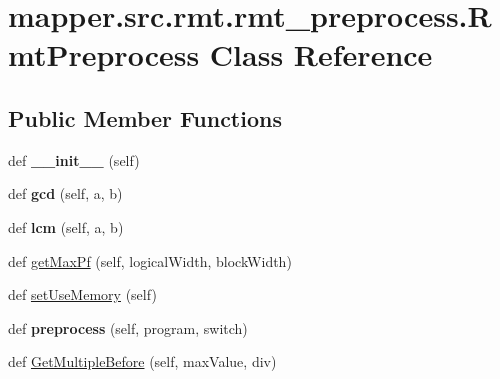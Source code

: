 \hypertarget{classmapper_1_1src_1_1rmt_1_1rmt__preprocess_1_1_rmt_preprocess}{}\section{mapper.\+src.\+rmt.\+rmt\+\_\+preprocess.\+Rmt\+Preprocess Class Reference}
\label{classmapper_1_1src_1_1rmt_1_1rmt__preprocess_1_1_rmt_preprocess}
\subsection*{Public Member Functions}
\begin{DoxyCompactItemize}
\item 
\hypertarget{classmapper_1_1src_1_1rmt_1_1rmt__preprocess_1_1_rmt_preprocess_abb7c6342b677d89bd5c30ae8b15f0bde}{}def {\bfseries \+\_\+\+\_\+init\+\_\+\+\_\+} (self)\label{classmapper_1_1src_1_1rmt_1_1rmt__preprocess_1_1_rmt_preprocess_abb7c6342b677d89bd5c30ae8b15f0bde}

\item 
\hypertarget{classmapper_1_1src_1_1rmt_1_1rmt__preprocess_1_1_rmt_preprocess_aba33c11825b0942591ccb5746d8fd33c}{}def {\bfseries gcd} (self, a, b)\label{classmapper_1_1src_1_1rmt_1_1rmt__preprocess_1_1_rmt_preprocess_aba33c11825b0942591ccb5746d8fd33c}

\item 
\hypertarget{classmapper_1_1src_1_1rmt_1_1rmt__preprocess_1_1_rmt_preprocess_acfacdd8410766e90b3f3d15308bc43c4}{}def {\bfseries lcm} (self, a, b)\label{classmapper_1_1src_1_1rmt_1_1rmt__preprocess_1_1_rmt_preprocess_acfacdd8410766e90b3f3d15308bc43c4}

\item 
def \hyperlink{classmapper_1_1src_1_1rmt_1_1rmt__preprocess_1_1_rmt_preprocess_a4bfd6f429acb6f63243f1a018f4d54af}{get\+Max\+Pf} (self, logical\+Width, block\+Width)
\item 
def \hyperlink{classmapper_1_1src_1_1rmt_1_1rmt__preprocess_1_1_rmt_preprocess_a1fb9e91cb837066f68093a268a6ce052}{set\+Use\+Memory} (self)
\item 
\hypertarget{classmapper_1_1src_1_1rmt_1_1rmt__preprocess_1_1_rmt_preprocess_a52b987e622ab3d84f404eed1904a3303}{}def {\bfseries preprocess} (self, program, switch)\label{classmapper_1_1src_1_1rmt_1_1rmt__preprocess_1_1_rmt_preprocess_a52b987e622ab3d84f404eed1904a3303}

\item 
def \hyperlink{classmapper_1_1src_1_1rmt_1_1rmt__preprocess_1_1_rmt_preprocess_aeca39b4dac4364d55579aba84ccb28db}{Get\+Multiple\+Before} (self, max\+Value, div)
\end{DoxyCompactItemize}
